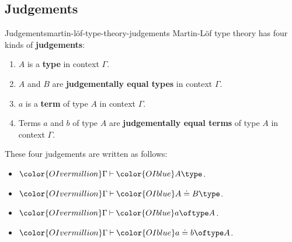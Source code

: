 \subsection{Judgements}\label{subsection-martin-löf-type-theory-judgements}
\begin{definition}{Judgements}{martin-löf-type-theory-judgements}%
    Martin-Löf type theory has four kinds of \textbf{judgements}:
    \begin{enumerate}
        \item\label{martin-löf-type-theory-being-a-type}$A$ is a \textbf{type} in context $\Gamma$.
        \item\label{martin-löf-type-theory-being-judgementally-equal-types}$A$ and $B$ are \textbf{judgementally equal types} in context $\Gamma$.
        \item\label{martin-löf-type-theory-being-a-term}$a$ is a \textbf{term} of type $A$ in context $\Gamma$.
        \item\label{martin-löf-type-theory-being-judgementally-equal-terms}Terms $a$ and $b$ of type $A$ are \textbf{judgementally equal terms} of type $A$ in context $\Gamma$.
    \end{enumerate}
    These four judgements are written as follows:
    \begin{itemize}
        \item ${\color{OIvermillion}\Gamma}\mathbin{\vdash}{\color{OIblue}A\type}$.
        \item ${\color{OIvermillion}\Gamma}\mathbin{\vdash}{\color{OIblue}A\doteq B\type}$.
        \item ${\color{OIvermillion}\Gamma}\mathbin{\vdash}{\color{OIblue}a\oftype A}$.
        \item ${\color{OIvermillion}\Gamma}\mathbin{\vdash}{\color{OIblue}a\doteq b\oftype A}$.
    \end{itemize}
\end{definition}
